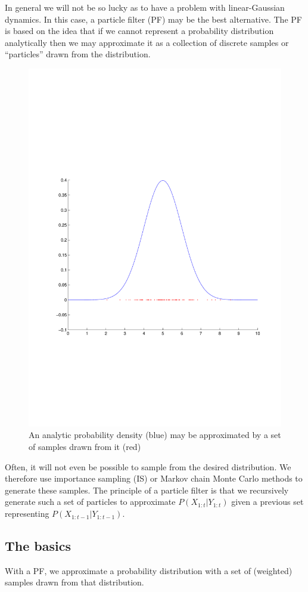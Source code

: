 In general we will not be so lucky as to have a problem with linear-Gaussian dynamics. In this case, a particle filter (PF) may be the best alternative. The PF is based on the idea that if we cannot represent a probability distribution analytically then we may approximate it as a collection of discrete samples or ``particles'' drawn from the distribution.

\begin{figure}[!hbt] \centering
\includegraphics[width=0.7\columnwidth]{MonteCarlo.pdf}%
\caption{An analytic probability density (blue) may be approximated by a set of samples drawn from it (red)}%
\label{fig:MonteCarlo}%
\end{figure}

Often, it will not even be possible to sample from the desired distribution. We therefore use importance sampling (IS) or Markov chain Monte Carlo methods to generate these samples. The principle of a particle filter is that we recursively generate such a set of particles to approximate $P(X_{1:t}|Y_{1:t})$ given a previous set representing $P(X_{1:t-1}|Y_{1:t-1})$.

\subsection{The basics}

With a PF, we approximate a probability distribution with a set of (weighted) samples drawn from that distribution.

